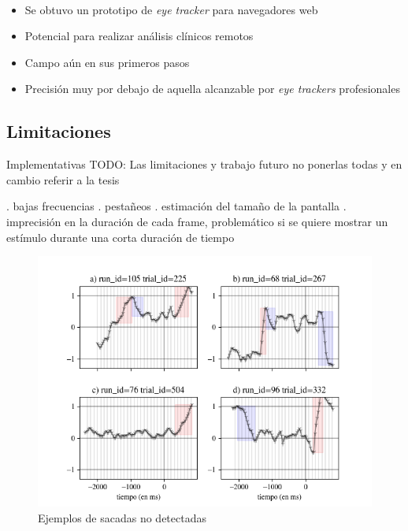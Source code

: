 \documentclass[aspectratio=169]{beamer}
\begin{document}
\begin{frame}{~}
  \begin{itemize}
    \item Se obtuvo un prototipo de \textit{eye tracker} para navegadores web
    \item Potencial para realizar análisis clínicos remotos
    \item Campo aún en sus primeros pasos
    \item Precisión muy por debajo de aquella alcanzable por \textit{eye
      trackers} profesionales
  \end{itemize}
\end{frame}

\subsection{Limitaciones}

\begin{frame}{Implementativas}
  TODO: Las limitaciones y trabajo futuro no ponerlas todas y en cambio referir
  a la tesis \par

. bajas frecuencias
. pestañeos
. estimación del tamaño de la pantalla
. imprecisión en la duración de cada frame, problemático si se quiere mostrar
  un estímulo durante una corta duración de tiempo

  \begin{figure}
    \centering
    \includegraphics[width=0.9\linewidth]{img/undetected-saccades-examples.png}
    \caption{Ejemplos de sacadas no detectadas}
  \end{figure}
\end{frame}
\end{document}
